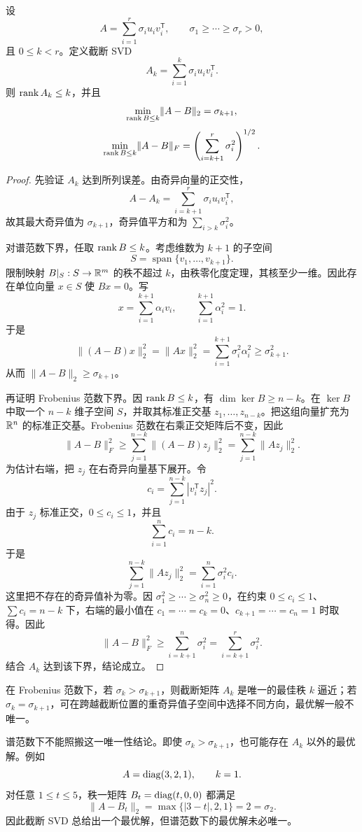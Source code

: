\begin{theorem}
设
\[
A=\sum_{i=1}^r\sigma_i u_iv_i^{\mathsf T},
\qquad
\sigma_1\ge\cdots\ge\sigma_r>0,
\]
且 $0\le k<r$。定义截断 SVD
\[
A_k=\sum_{i=1}^k\sigma_i u_iv_i^{\mathsf T}.
\]
则 $\operatorname{rank} A_k\le k$，并且
\[
\min_{\operatorname{rank} B\le k}\lVert A-B\rVert_2=\sigma_{k+1},
\]
\[
\min_{\operatorname{rank} B\le k}\lVert A-B\rVert_F
=\left(\sum_{i=k+1}^r\sigma_i^2\right)^{1/2}.
\]
\end{theorem}
\begin{proof}
先验证 $A_k$ 达到所列误差。由奇异向量的正交性，
\[
A-A_k=\sum_{i=k+1}^r\sigma_i u_iv_i^{\mathsf T},
\]
故其最大奇异值为 $\sigma_{k+1}$，奇异值平方和为 $\sum_{i>k}\sigma_i^2$。

对谱范数下界，任取 $\operatorname{rank} B\le k$。考虑维数为 $k+1$ 的子空间
\[
S=\operatorname{span}\{v_1,\ldots,v_{k+1}\}.
\]
限制映射 $B|_S:S\to\mathbb{R}^m$ 的秩不超过 $k$，由秩零化度定理，其核至少一维。因此存在单位向量 $x\in S$ 使 $Bx=0$。写
\[
x=\sum_{i=1}^{k+1}\alpha_iv_i,
\qquad \sum_{i=1}^{k+1}\alpha_i^2=1.
\]
于是
\[
\lVert(A-B)x\rVert_2^2
=\lVert Ax\rVert_2^2
=\sum_{i=1}^{k+1}\sigma_i^2\alpha_i^2
\ge\sigma_{k+1}^2.
\]
从而 $\lVert A-B\rVert_2\ge\sigma_{k+1}$。

再证明 Frobenius 范数下界。因 $\operatorname{rank} B\le k$，有
$\dim\ker B\ge n-k$。在 $\ker B$ 中取一个 $n-k$ 维子空间 $S$，并取其标准正交基
$z_1,\ldots,z_{n-k}$。把这组向量扩充为 $\mathbb{R}^n$ 的标准正交基。Frobenius 范数在右乘正交矩阵后不变，因此
\[
\lVert A-B\rVert_F^2
\ge\sum_{j=1}^{n-k}\lVert(A-B)z_j\rVert_2^2
=\sum_{j=1}^{n-k}\lVert Az_j\rVert_2^2.
\]
为估计右端，把 $z_j$ 在右奇异向量基下展开。令
\[
c_i=\sum_{j=1}^{n-k}|v_i^{\mathsf T}z_j|^2.
\]
由于 $z_j$ 标准正交，$0\le c_i\le1$，并且
\[
\sum_{i=1}^nc_i=n-k.
\]
于是
\[
\sum_{j=1}^{n-k}\lVert Az_j\rVert_2^2
=\sum_{i=1}^n\sigma_i^2c_i.
\]
这里把不存在的奇异值补为零。因 $\sigma_1^2\ge\cdots\ge\sigma_n^2\ge0$，在约束
$0\le c_i\le1$、$\sum c_i=n-k$ 下，右端的最小值在
$c_1=\cdots=c_k=0$、$c_{k+1}=\cdots=c_n=1$ 时取得。因此
\[
\lVert A-B\rVert_F^2
\ge\sum_{i=k+1}^n\sigma_i^2
=\sum_{i=k+1}^r\sigma_i^2.
\]
结合 $A_k$ 达到该下界，结论成立。
\end{proof}

\begin{remark}[最优解何时唯一]
在 Frobenius 范数下，若 $\sigma_k>\sigma_{k+1}$，则截断矩阵 $A_k$ 是唯一的最佳秩 $k$ 逼近；若 $\sigma_k=\sigma_{k+1}$，可在跨越截断位置的重奇异值子空间中选择不同方向，最优解一般不唯一。

谱范数下不能照搬这一唯一性结论。即使 $\sigma_k>\sigma_{k+1}$，也可能存在 $A_k$ 以外的最优解。例如
\[
A=\operatorname{diag}(3,2,1),\qquad k=1.
\]
对任意 $1\le t\le5$，秩一矩阵 $B_t=\operatorname{diag}(t,0,0)$ 都满足
\[
\lVert A-B_t\rVert_2
=\max\{|3-t|,2,1\}=2=\sigma_2.
\]
因此截断 SVD 总给出一个最优解，但谱范数下的最优解未必唯一。
\end{remark}

